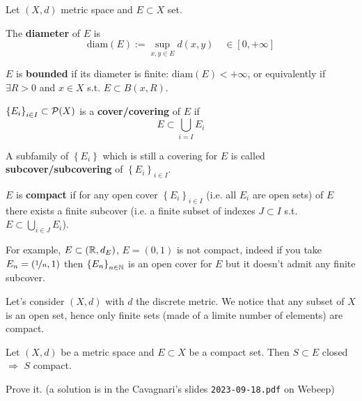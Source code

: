 Let $(X,d)$ metric space and $E\subset X$ set.

\begin{defn}
The \textbf{diameter} of $E$ is
\begin{equation*}
\text{diam}(E):=\sup_{x,y\in E} d(x,y)\quad\in[0,+\infty]
\end{equation*}
\end{defn}

\begin{defn}
$E$ is \textbf{bounded} if its diameter is finite: $\text{diam}(E)<+\infty$, or equivalently if $\exists R>0$ and $x\in X$ s.t. $E\subset B(x,R)$.
\end{defn}

\begin{defn}
$\left\{ E_i \right\}_{i\in I}\subset\mathcal{P}(X)$ is a \textbf{cover/covering} of $E$ if 
\begin{equation*}
E\subset\bigcup_{i=I} E_i
\end{equation*}

A subfamily of $\left\{ E_i \right\}$ which is still a covering for $E$ is called \textbf{subcover/subcovering} of $\left\{ E_i \right\}_{i\in I}$.
\end{defn}

\begin{defn}
$E$ is \textbf{compact} if for any open cover $\left\{ E_i \right\}_{i\in I}$ (i.e. all $E_i$ are open sets) of $E$ there exists a finite subcover (i.e. a finite subset of indexes $J\subset I$ s.t. $E\subset\bigcup_{i\in J}E_i$).
\end{defn}

For example, $E\subset(\mathbb{R},d_E)$, $E=(0,1)$ is not compact, indeed if you take $E_n=\left( \nicefrac{1}{n},1 \right)$ then $\left\{ E_n \right\}_{n\in \mathbb{N}}$ is an open cover for $E$ but it doesn't admit any finite subcover.

\begin{marker}
Let's consider $(X,d)$ with $d$ the discrete metric. We notice that any subset of $X$ is an open set, hence only finite sets (made of a limite number of elements) are compact.
\end{marker}

\begin{thm}
Let $(X,d)$ be a metric space and $E\subset X$ be a compact set. Then $S\subset E$ closed $\Longrightarrow$ $S$ compact.
\end{thm}

\begin{home}
Prove it.
\newline
\newline
\newline
\newline
\newline
\newline
\newline
\newline
(a solution is in the Cavagnari's slides \texttt{2023-09-18.pdf} on Webeep)
\end{home}

